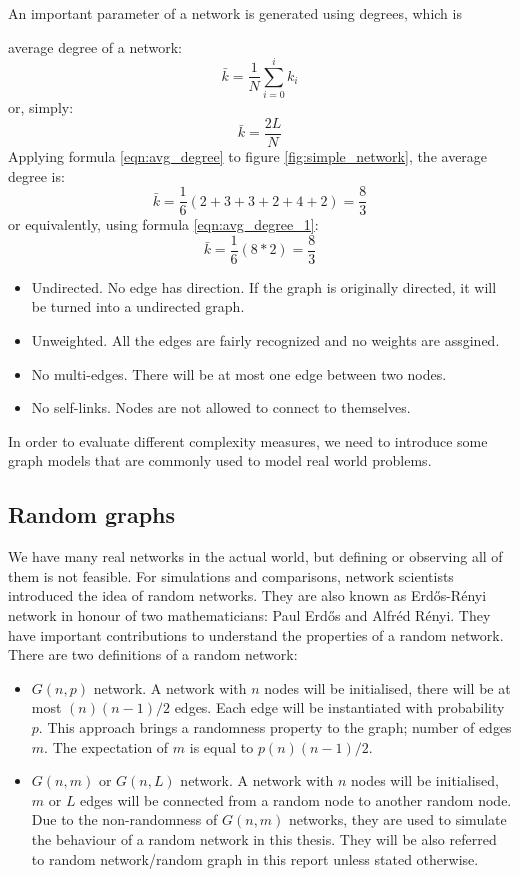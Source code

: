 \documentclass[12pt]{article}
\begin{document}
An important parameter of a network is generated using degrees, which is {average degree of a network:
\begin{equation}
    \bar{k}=\frac{1}{N} \sum^{i}_{i=0}{k_i}
    \label{eqn:avg_degree}
\end{equation}
or, simply:
\begin{equation}
    \bar{k}=\frac{2L}{N}
    \label{eqn:avg_degree_1}
\end{equation}
Applying formula \ref{eqn:avg_degree} to figure \ref{fig:simple_network}, the average degree is:
\begin{equation}
    \bar{k} = \frac{1}{6}(2+3+3+2+4+2)=\frac{8}{3}
\end{equation}
or equivalently, using formula \ref{eqn:avg_degree_1}:
\begin{equation}
    \bar{k} = \frac{1}{6}(8*2)=\frac{8}{3}
\end{equation}


\begin{itemize}
    \item Undirected. No edge has direction. If the graph is originally directed, it will be turned into a undirected graph.
    \item Unweighted. All the edges are fairly recognized and no weights are assgined.
    \item No multi-edges. There will be at most one edge between two nodes.
    \item No self-links. Nodes are not allowed to connect to themselves. 
\end{itemize}
In order to evaluate different complexity measures, we need to introduce some graph models that are commonly used to model real world problems.
\subsection{Random graphs}
We have many real networks in the actual world, but defining or observing all of them is not feasible. For simulations and comparisons, network scientists introduced the idea of random networks. They are also known as Erd\H{o}s-R\'{e}nyi network in honour of two mathematicians: Paul Erd\H{o}s and Alfr\'{e}d R\'{e}nyi. They have important contributions to understand the properties of a random network\cite{renyi1959random}.\\
\noindent
There are two definitions of a random network:
\begin{itemize}
    \item $G(n,p)$ network. A network with $n$ nodes will be initialised, there will be at most $(n)(n-1)/2$ edges. Each edge will be instantiated with probability $p$. This approach brings a randomness property to the graph; number of edges $m$. The expectation of $m$ is equal to $p(n)(n-1)/2$.
    \item $G(n,m)$ or $G(n,L)$ network. A network with $n$ nodes will be initialised, $m$ or $L$ edges will be connected from a random node to another random node. Due to the non-randomness of $G(n,m)$ networks, they are used to simulate the behaviour of a random network in this thesis. They will be also referred to random network/random graph in this report unless stated otherwise.
\end{itemize}

}
\end{document}
